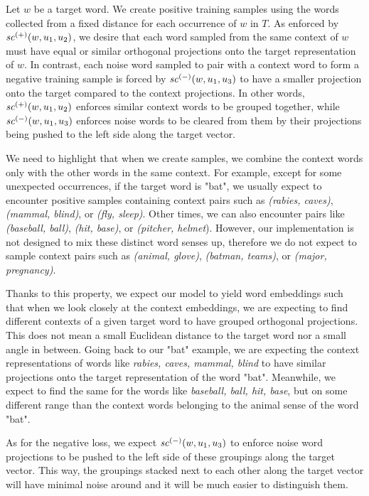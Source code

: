 Let $w$ be a target word. We create positive training samples using the words collected from a fixed distance for each occurrence of $w$ in $T$. As enforced by $\mathit{sc}^{({+})}({w, u_1, u_2})$, we desire that each word sampled from the same context of $w$ must have equal or similar orthogonal projections onto the target representation of $w$. In contrast, each noise word sampled to pair with a context word to form a negative training sample is forced by $\mathit{sc}^{({-})}({w, u_1, u_3})$ to have a smaller projection onto the target compared to the context projections. In other words, $\mathit{sc}^{({+})}({w, u_1, u_2})$ enforces similar context words to be grouped together, while $\mathit{sc}^{({-})}({w, u_1, u_3})$ enforces noise words to be cleared from them by their projections being pushed to the left side along the target vector.

We need to highlight that when we create samples, we combine the context words only with the other words in the same context. For example, except for some unexpected occurrences, if the target word is "bat", we usually expect to encounter positive samples containing context pairs such as \textit{(rabies, caves)}, \textit{(mammal, blind)}, or \textit{(fly, sleep)}. Other times, we can also encounter pairs like \textit{(baseball, ball)}, \textit{(hit, base)}, or \textit{(pitcher, helmet}). However, our implementation is not designed to mix these distinct word senses up, therefore we do not expect to sample context pairs such as \textit{(animal, glove)}, \textit{(batman, teams)}, or \textit{(major, pregnancy)}.

Thanks to this property, we expect our model to yield word embeddings such that when we look closely at the context embeddings, we are expecting to find different contexts of a given target word to have grouped orthogonal projections. This does not mean a small Euclidean distance to the target word nor a small angle in between. Going back to our "bat" example, we are expecting the context representations of words like \textit{rabies, caves, mammal, blind} to have similar projections onto the target representation of the word "bat". Meanwhile, we expect to find the same for the words like \textit{baseball, ball, hit, base}, but on some different range than the context words belonging to the animal sense of the word "bat".

As for the negative loss, we expect $\mathit{sc}^{({-})}({w, u_1, u_3})$ to enforce noise word projections to be pushed to the left side of these groupings along the target vector. This way, the groupings stacked next to each other along the target vector will have minimal noise around and it will be much easier to distinguish them.


